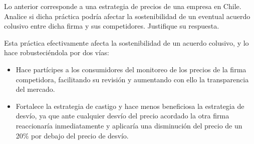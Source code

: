 Lo anterior corresponde a una estrategia de precios de una empresa en Chile. Analice si dicha práctica podría afectar la sostenibilidad de un eventual acuerdo colusivo entre dicha firma y sus competidores. Justifique su respuesta.
\begin{solution}
Esta práctica efectivamente afecta la sostenibilidad de un acuerdo colusivo, y lo hace robusteciéndola por dos vías:
\begin{itemize}
  \item Hace partícipes a los consumidores del monitoreo de los precios de la firma competidora, facilitando su revisión y aumentando con ello la transparencia del mercado.
  \item Fortalece la estrategia de castigo y hace menos beneficiosa la estrategia de desvío, ya que ante cualquier desvío del precio acordado la otra firma reaccionaría inmediatamente y aplicaría una disminución del precio de un 20\% por debajo del precio de desvío.
\end{itemize}

\end{solution}

